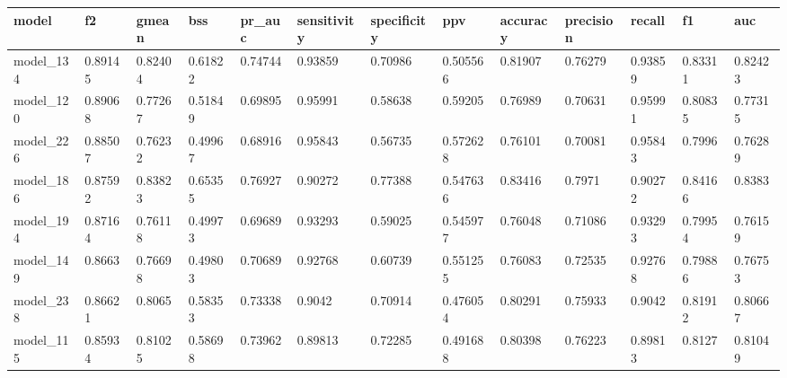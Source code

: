 \begin{tabular}{|l|l|l|l|l|l|l|l|l|l|l|l|l|}
\hline
\textbf{model} & \textbf{f2} & \textbf{gmean} & \textbf{bss} & \textbf{pr\_auc} & \textbf{sensitivity} & \textbf{specificity} & \textbf{ppv} & \textbf{accuracy} & \textbf{precision} & \textbf{recall} & \textbf{f1} & \textbf{auc} \\ \hline
model\_134     & 0.89145     & 0.82404        & 0.61822      & 0.74744          & 0.93859              & 0.70986              & 0.505566     & 0.81907           & 0.76279            & 0.93859         & 0.83311     & 0.82423      \\ \hline
model\_120     & 0.89068     & 0.77267        & 0.51849      & 0.69895          & 0.95991              & 0.58638              & 0.59205      & 0.76989           & 0.70631            & 0.95991         & 0.80835     & 0.77315      \\ \hline
model\_226     & 0.88507     & 0.76232        & 0.49967      & 0.68916          & 0.95843              & 0.56735              & 0.572628     & 0.76101           & 0.70081            & 0.95843         & 0.7996      & 0.76289      \\ \hline
model\_186     & 0.87592     & 0.83823        & 0.65355      & 0.76927          & 0.90272              & 0.77388              & 0.547636     & 0.83416           & 0.7971             & 0.90272         & 0.84166     & 0.8383       \\ \hline
model\_194     & 0.87164     & 0.76118        & 0.49973      & 0.69689          & 0.93293              & 0.59025              & 0.545977     & 0.76048           & 0.71086            & 0.93293         & 0.79954     & 0.76159      \\ \hline
model\_149     & 0.8663      & 0.76698        & 0.49803      & 0.70689          & 0.92768              & 0.60739              & 0.551255     & 0.76083           & 0.72535            & 0.92768         & 0.79886     & 0.76753      \\ \hline
model\_238     & 0.86621     & 0.8065         & 0.58353      & 0.73338          & 0.9042               & 0.70914              & 0.476054     & 0.80291           & 0.75933            & 0.9042          & 0.81912     & 0.80667      \\ \hline
model\_115     & 0.85934     & 0.81025        & 0.58698      & 0.73962          & 0.89813              & 0.72285              & 0.491688     & 0.80398           & 0.76223            & 0.89813         & 0.8127      & 0.81049      \\ \hline

\end{tabular}
